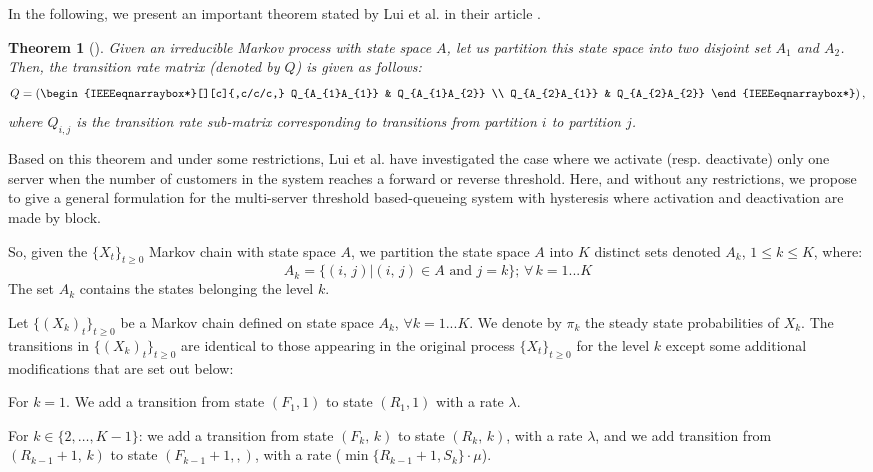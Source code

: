 \documentclass[conference]{IEEEtran}
\newtheorem{thm}{Theorem}
\begin{document}
In the following, we present an important theorem stated by  Lui et al.   in their article \cite{lui1999stochastic}.%
\begin{thm}[\cite{lui1999stochastic}]
\label{thm:thm1}
Given an irreducible Markov process with state space $A$, let us partition this state space into two disjoint set $A_1$ and $A_2$. 
Then, the transition rate matrix (denoted by $Q$) is given as follows:
\begin{equation*}
Q = \left(\begin{IEEEeqnarraybox*}[][c]{,c/c/c,}
    Q_{A_{1}A_{1}}       & Q_{A_{1}A_{2}} \\
    Q_{A_{2}A_{1}}       & Q_{A_{2}A_{2}} %
\end{IEEEeqnarraybox*}\right),
\end{equation*}
where $Q_{i,j}$ is the transition rate sub-matrix corresponding to transitions from partition $i$ to partition $j$.
\end{thm}

Based on this theorem and under some restrictions, Lui et al. have investigated the case where we activate (resp. deactivate) only one server  
when the number of customers in the system reaches a forward or reverse threshold. Here, and without any restrictions, we propose to give a general 
formulation for the multi-server threshold based-queueing system with hysteresis  where activation and deactivation are made by block.

So, given the $\{X_{t}\}_{t \geq 0}$ Markov chain with state space $A$,  we partition the state space  $A$ into $K$ distinct sets 
denoted $A_{k}$, $1 \leq k \leq K$, where:
\begin{equation}
A_{k}=\{(i,\,j)|(i,\,j) \in A \mbox{ and } j=k\}; \, \forall \, k=1...K 
\end{equation}
The set $A_{k}$ contains the states belonging the level $k$.

Let $\{(X_{k})_{t}\}_{t \geq 0}$ be a Markov chain defined on state space $A_{k}$, $\forall k=1...K$. 
We denote by  $\pi_{k}$ the steady state probabilities of $X_{k}$. 
The transitions in $\{(X_{k})_{t}\}_{t \geq 0}$ are identical to those appearing in the original process $\{X_{t}\}_{t \geq 0}$ 
for the level $k$ except some additional modifications that are set out below:

For $k=1$. We add a transition from state $(F_{1},1)$ to state $(R_{1},1)$ with a rate $\lambda$.

For $k \in \{2,\ldots,K-1\}$:  we add a transition from state $(F_{k},\,k)$ to state $(R_{k},\,k)$, 
with a rate $\lambda$, and we add transition from $(R_{k-1}+1,\,k)$ to state $(F_{k-1}+1,,)$, with a rate ($\min\{R_{k-1}+1,S_k\} \cdot \mu$).
\end{document}
